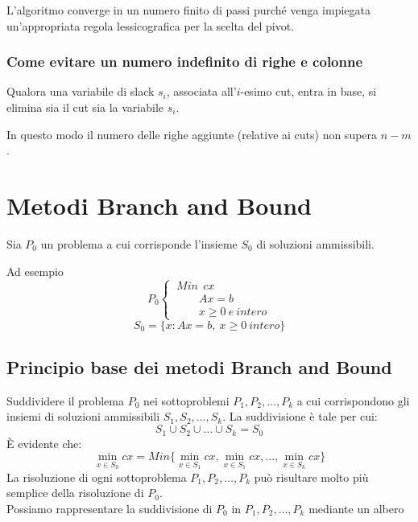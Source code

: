 L'algoritmo converge in un numero finito di passi purché venga impiegata un'appropriata regola lessicografica per la scelta del pivot.

\subsubsection{Come evitare un numero indefinito di righe e colonne}
Qualora una variabile di slack $s_{i}$, associata all'$i$-esimo cut, entra in base, si elimina sia il cut sia la variabile $s_{i}$.

In questo modo il numero delle righe aggiunte (relative ai cuts) non supera $n-m$.

\section{Metodi Branch and Bound}
Sia $P_{0}$ un problema a cui corrisponde l'insieme $S_{0}$ di soluzioni ammissibili.

Ad esempio
\begin{displaymath}
P_{0}
\begin{cases}
\ Min\ \ cx\\
\ \ \ \ \ \ \ \ \ \ A x = b\\
\ \ \ \ \ \ \ \ \ \ x \ge 0\ e\:intero
\end{cases}
\end{displaymath}
\begin{equation*}
	S_{0}=\{x:Ax=b,\ x\ge 0\ intero\}
\end{equation*}

\subsection{Principio base dei metodi Branch and Bound}
Suddividere il problema $P_{0}$ nei sottoproblemi $P_{1},P_{2},\dots,P_{k}$ a cui corrispondono gli insiemi di soluzioni ammissibili $S_{1},S_{2},\dots,S_{k}$. La suddivisione è tale per cui:
\begin{equation*}
S_{1} \cup S_{2} \cup \dots \cup S_{k} = S_{0}
\end{equation*}
È evidente che:
\begin{equation*}
\min_{x \in S_{0}} cx = Min\{\min_{x\in S_{1}} cx, \min_{x\in S_{1}}cx,\dots,\min_{x\in S_{k}}cx\}
\end{equation*}
La risoluzione di ogni sottoproblema $P_{1},P_{2},\dots,P_{k}$ può risultare molto più semplice della risoluzione di $P_{0}$.\\
Possiamo rappresentare la suddivisione di $P_{0}$ in $P_{1},P_{2},\dots,P_{k}$ mediante un albero

